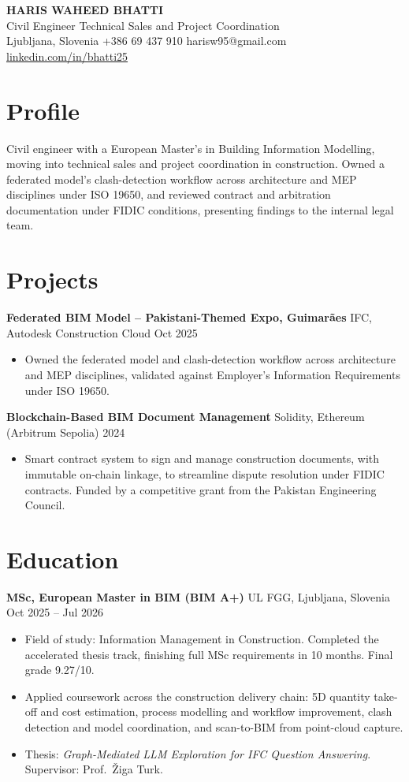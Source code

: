 \documentclass[a4paper,10.5pt]{article}
\newcommand{\datefill}{\dotfill}
\newcommand{\entry}[3]{\vspace{2.5pt}\noindent\textbf{#1} \textbar{} #2 \datefill{} #3\par\vspace{0.5pt}}
\newcommand{\ROLELINE}{Civil Engineer \textbar{} Technical Sales and Project Coordination}
\newcommand{\projGuimaraes}{%
\entry{Federated BIM Model -- Pakistani-Themed Expo, Guimar\~aes}{IFC, Autodesk Construction Cloud}{Oct 2025}
\begin{itemize}
  \item Owned the federated model and clash-detection workflow across architecture
        and MEP disciplines, validated against Employer's Information Requirements
        under ISO 19650.
\end{itemize}}
\newcommand{\projBlockchain}{%
\entry{Blockchain-Based BIM Document Management}{Solidity, Ethereum (Arbitrum Sepolia)}{2024}
\begin{itemize}
  \item Smart contract system to sign and manage construction documents, with
        immutable on-chain linkage, to streamline dispute resolution under FIDIC
        contracts. Funded by a competitive grant from the
        Pakistan Engineering Council.
\end{itemize}}
\begin{document}
\begin{center}
  {\LARGE\bfseries HARIS WAHEED BHATTI}\\[2pt]
  {\large \ROLELINE}\\[3pt]
  Ljubljana, Slovenia \textbar{} +386 69 437 910 \textbar{} harisw95@gmail.com\\
  \href{https://linkedin.com/in/bhatti25}{linkedin.com/in/bhatti25}
\end{center}
\vspace{-4pt}

\section{Profile}

\noindent Civil engineer with a European Master's in Building Information Modelling,
moving into technical sales and project coordination in construction. Owned a
federated model's clash-detection workflow across architecture and MEP disciplines
under ISO 19650, and reviewed contract and arbitration documentation under FIDIC
conditions, presenting findings to the internal legal team.

\section{Projects}

 \projGuimaraes \projBlockchain

\section{Education}
\entry{MSc, European Master in BIM (BIM A+)}{UL FGG, Ljubljana, Slovenia}{Oct 2025 -- Jul 2026}
\begin{itemize}
  \item Field of study: Information Management in Construction. Completed the
        accelerated thesis track, finishing full MSc requirements in 10 months.
        Final grade 9.27/10.
  \item Applied coursework across the construction delivery chain: 5D quantity
        take-off and cost estimation, process modelling and workflow improvement,
        clash detection and model coordination, and scan-to-BIM from point-cloud
        capture.
  \item Thesis: \textit{Graph-Mediated LLM Exploration for IFC Question Answering}.
        Supervisor: Prof.~\v{Z}iga Turk.
\end{itemize}
\end{document}
